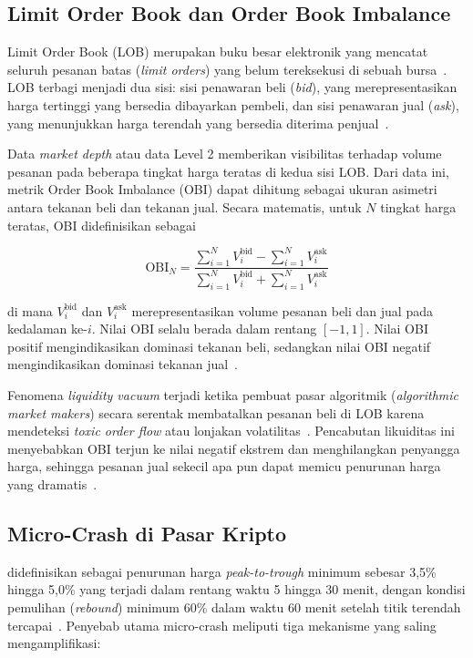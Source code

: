 \documentclass[conference]{IEEEtran}
\begin{document}
\subsection{Limit Order Book dan Order Book Imbalance}

Limit Order Book (LOB) merupakan buku besar elektronik yang mencatat seluruh pesanan batas (\textit{limit orders}) yang belum tereksekusi di sebuah bursa~\cite{cont2010}. LOB terbagi menjadi dua sisi: sisi penawaran beli (\textit{bid}), yang merepresentasikan harga tertinggi yang bersedia dibayarkan pembeli, dan sisi penawaran jual (\textit{ask}), yang menunjukkan harga terendah yang bersedia diterima penjual~\cite{cont2001}.

Data \textit{market depth} atau data Level 2 memberikan visibilitas terhadap volume pesanan pada beberapa tingkat harga teratas di kedua sisi LOB. Dari data ini, metrik Order Book Imbalance (OBI) dapat dihitung sebagai ukuran asimetri antara tekanan beli dan tekanan jual. Secara matematis, untuk $N$ tingkat harga teratas, OBI didefinisikan sebagai

\begin{equation}
\text{OBI}_N = \frac{\sum_{i=1}^{N} V_i^{\text{bid}} - \sum_{i=1}^{N} V_i^{\text{ask}}}{\sum_{i=1}^{N} V_i^{\text{bid}} + \sum_{i=1}^{N} V_i^{\text{ask}}}
\label{eq:obi}
\end{equation}

\noindent di mana $V_i^{\text{bid}}$ dan $V_i^{\text{ask}}$ merepresentasikan volume pesanan beli dan jual pada kedalaman ke-$i$. Nilai OBI selalu berada dalam rentang $[-1, 1]$. Nilai OBI positif mengindikasikan dominasi tekanan beli, sedangkan nilai OBI negatif mengindikasikan dominasi tekanan jual~\cite{cont2001}.

Fenomena \textit{liquidity vacuum} terjadi ketika pembuat pasar algoritmik (\textit{algorithmic market makers}) secara serentak membatalkan pesanan beli di LOB karena mendeteksi \textit{toxic order flow} atau lonjakan volatilitas~\cite{easley2011}. Pencabutan likuiditas ini menyebabkan OBI terjun ke nilai negatif ekstrem dan menghilangkan penyangga harga, sehingga pesanan jual sekecil apa pun dapat memicu penurunan harga yang dramatis~\cite{foucault2005}.

\subsection{Micro-Crash di Pasar Kripto}

 didefinisikan sebagai penurunan harga \textit{peak-to-trough} minimum sebesar 3,5\% hingga 5,0\% yang terjadi dalam rentang waktu 5 hingga 30 menit, dengan kondisi pemulihan (\textit{rebound}) minimum 60\% dalam waktu 60 menit setelah titik terendah tercapai~\cite{mdpi2025}. Penyebab utama micro-crash meliputi tiga mekanisme yang saling mengamplifikasi:
\end{document}
